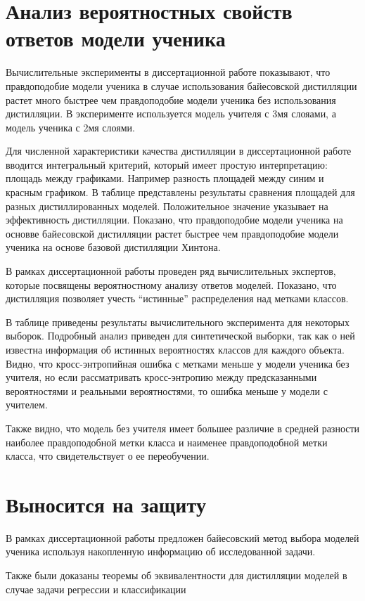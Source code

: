\documentclass[10pt, twoside]{article}
\begin{document}
\section{Анализ вероятностных свойств ответов модели ученика}
Вычислительные эксперименты в диссертационной работе показывают, что правдоподобие модели ученика в случае использования байесовской дистилляции растет много быстрее чем правдоподобие модели ученика без использования дистилляции. В эксперименте используется модель учителя с 3мя слояами, а модель ученика с 2мя слоями.

Для численной характеристики качества дистилляции в диссертационной работе вводится интегральный критерий, который имеет простую интерпретацию: площадь между графиками. Например разность площадей между синим и красным графиком. В таблице представлены результаты сравнения площадей для разных дистиллированных моделей. Положительное значение указывает на эффективность дистилляции. Показано, что правдоподобие модели ученика на основве байесовской дистилляции растет быстрее чем правдоподобие модели ученика на основе базовой дистилляции Хинтона.

В рамках диссертационной работы проведен ряд вычислительных экспертов, которые посвящены вероятностному анализу ответов моделей. Показано, что дистилляция позволяет учесть ``истинные'' распределения над метками классов.

В таблице приведены результаты вычислительного эксперимента для некоторых выборок. Подробный анализ приведен для синтетической выборки, так как о ней известна информация об истинных вероятностях классов для каждого объекта. Видно, что кросс-энтропийная ошибка с метками меньше у модели ученика без учителя, но если рассматривать кросс-энтропию между предсказанными вероятностями и реальными вероятностями, то ошибка меньше у модели с учителем.

Также видно, что модель без учителя имеет большее различие в средней разности наиболее правдоподобной метки класса и наименее правдоподобной метки класса, что свидетельствует о ее переобучении.

\section{Выносится на защиту}
В рамках диссертационной работы предложен байесовский метод выбора моделей ученика используя накопленную информацию об исследованной задачи.

Также были доказаны теоремы об эквивалентности для дистилляции моделей в случае задачи регрессии и классификации
\end{document}
